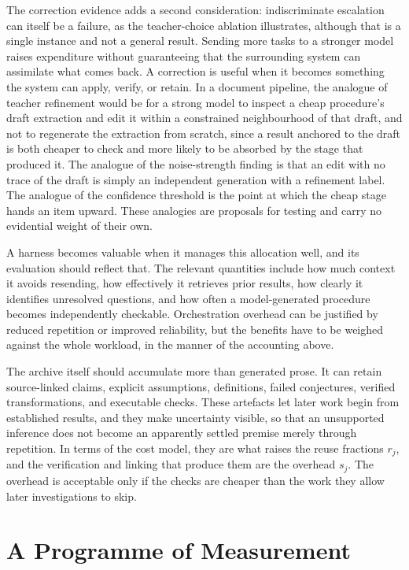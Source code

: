 \documentclass[11pt]{article}
\theoremstyle{remark}
\begin{document}
The correction evidence adds a second consideration: indiscriminate escalation can itself be a failure, as the teacher-choice ablation illustrates, although that is a single instance and not a general result. Sending more tasks to a stronger model raises expenditure without guaranteeing that the surrounding system can assimilate what comes back. A correction is useful when it becomes something the system can apply, verify, or retain. In a document pipeline, the analogue of teacher refinement would be for a strong model to inspect a cheap procedure's draft extraction and edit it within a constrained neighbourhood of that draft, and not to regenerate the extraction from scratch, since a result anchored to the draft is both cheaper to check and more likely to be absorbed by the stage that produced it. The analogue of the noise-strength finding is that an edit with no trace of the draft is simply an independent generation with a refinement label. The analogue of the confidence threshold is the point at which the cheap stage hands an item upward. These analogies are proposals for testing and carry no evidential weight of their own.

A harness becomes valuable when it manages this allocation well, and its evaluation should reflect that. The relevant quantities include how much context it avoids resending, how effectively it retrieves prior results, how clearly it identifies unresolved questions, and how often a model-generated procedure becomes independently checkable. Orchestration overhead can be justified by reduced repetition or improved reliability, but the benefits have to be weighed against the whole workload, in the manner of the accounting above.

The archive itself should accumulate more than generated prose. It can retain source-linked claims, explicit assumptions, definitions, failed conjectures, verified transformations, and executable checks. These artefacts let later work begin from established results, and they make uncertainty visible, so that an unsupported inference does not become an apparently settled premise merely through repetition. In terms of the cost model, they are what raises the reuse fractions $r_j$, and the verification and linking that produce them are the overhead $s_j$. The overhead is acceptable only if the checks are cheaper than the work they allow later investigations to skip.

\section{A Programme of Measurement}\label{sec:measure}
\end{document}
